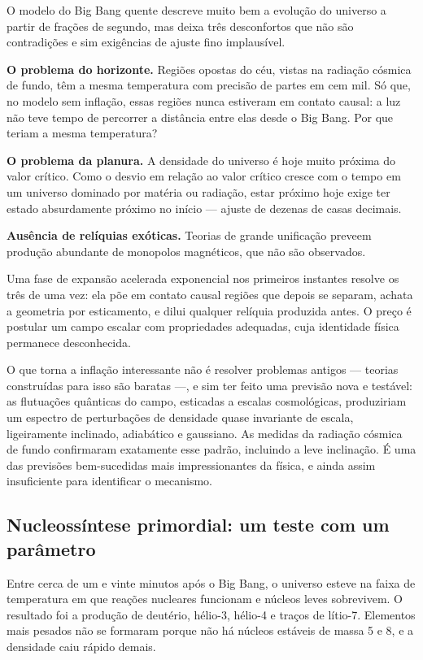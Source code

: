 \documentclass[11pt,a4paper]{article}
\begin{document}
O modelo do Big Bang quente descreve muito bem a evolução do universo a partir de frações de segundo, mas deixa três desconfortos que não são contradições e sim exigências de ajuste fino implausível.

\textbf{O problema do horizonte.} Regiões opostas do céu, vistas na radiação cósmica de fundo, têm a mesma temperatura com precisão de partes em cem mil. Só que, no modelo sem inflação, essas regiões nunca estiveram em contato causal: a luz não teve tempo de percorrer a distância entre elas desde o Big Bang. Por que teriam a mesma temperatura?

\textbf{O problema da planura.} A densidade do universo é hoje muito próxima do valor crítico. Como o desvio em relação ao valor crítico cresce com o tempo em um universo dominado por matéria ou radiação, estar próximo hoje exige ter estado absurdamente próximo no início --- ajuste de dezenas de casas decimais.

\textbf{Ausência de relíquias exóticas.} Teorias de grande unificação preveem produção abundante de monopolos magnéticos, que não são observados.

Uma fase de expansão acelerada exponencial nos primeiros instantes resolve os três de uma vez: ela põe em contato causal regiões que depois se separam, achata a geometria por esticamento, e dilui qualquer relíquia produzida antes. O preço é postular um campo escalar com propriedades adequadas, cuja identidade física permanece desconhecida.

O que torna a inflação interessante não é resolver problemas antigos --- teorias construídas para isso são baratas ---, e sim ter feito uma previsão nova e testável: as flutuações quânticas do campo, esticadas a escalas cosmológicas, produziriam um espectro de perturbações de densidade quase invariante de escala, ligeiramente inclinado, adiabático e gaussiano. As medidas da radiação cósmica de fundo confirmaram exatamente esse padrão, incluindo a leve inclinação. É uma das previsões bem-sucedidas mais impressionantes da física, e ainda assim insuficiente para identificar o mecanismo.

\subsection*{Nucleossíntese primordial: um teste com um parâmetro}

Entre cerca de um e vinte minutos após o Big Bang, o universo esteve na faixa de temperatura em que reações nucleares funcionam e núcleos leves sobrevivem. O resultado foi a produção de deutério, hélio-3, hélio-4 e traços de lítio-7. Elementos mais pesados não se formaram porque não há núcleos estáveis de massa 5 e 8, e a densidade caiu rápido demais.
\end{document}

